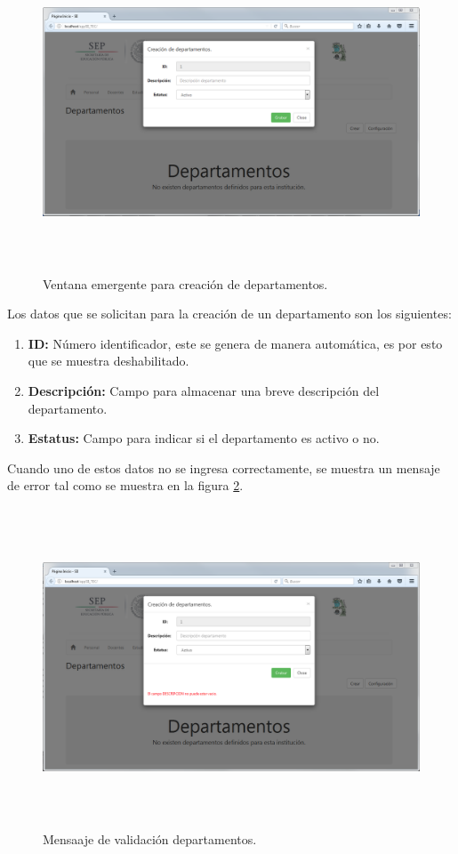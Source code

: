 			\begin{figure}[H]
		        \centering
		        \includegraphics[width=16cm, height=9.5cm]{figuras/DepartamentosCrear}
		        \caption{Ventana emergente para creaci\'on de departamentos.}
		        \label{fig_DepartamentosCrear}
		    \end{figure}
			
			Los datos que se solicitan para la creaci\'on de un departamento son los siguientes:
			\begin{enumerate}[1.]
				\item \textbf{ID:} N\'umero identificador, este se genera de manera autom\'atica, es por esto que se muestra deshabilitado.
				\item \textbf{Descripci\'on:} Campo para almacenar una breve descripci\'on del departamento.
				\item \textbf{Estatus:} Campo para indicar si el departamento es activo o no.
			\end{enumerate}

			Cuando uno de estos datos no se ingresa correctamente, se muestra un mensaje de error tal como se muestra en la figura \ref{fig_DepartamentosValida}.

			\begin{figure}[H]
		        \centering
		        \includegraphics[width=16cm, height=9.5cm]{figuras/DepartamentosValida}
		        \caption{Mensaaje de validaci\'on departamentos.}
		        \label{fig_DepartamentosValida}
		    \end{figure}

